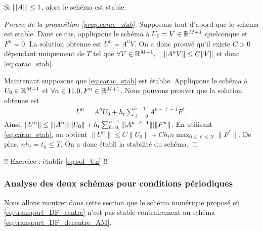 \documentclass[12pt,a4paper,twoside]{article}
\begin{document}
\begin{corrolary}
  \label{corro:stability}
  Si $\|\!\;\!| A \|\!\;\!| \leq 1$, alors le sch\'ema est stable.
\end{corrolary}

\begin{proof}[Preuve de la proposition \ref{prop:carac_stab}]
  Supposons tout d'abord que le sch\'ema est stable.
  Dans ce cas, appliquons le sch\'ema \`a $U_0 = V \in \mathbb{R}^{M+1}$
  quelconque et $F^n = 0$. 
  La solution obtenue est $U^n = A^n V$.
  On a donc prouv\'e qu'il existe $C>0$ d\'ependant uniquement
  de $T$ tel que
  $\forall V \in \mathbb{R}^{M+1} , \quad \| A^n V \| \leq C \| V \|$
  et donc \eqref{eq:carac_stab}.

  Maintenant supposons que \eqref{eq:carac_stab} est \'etablie.
  Appliquons le sch\'ema \`a $U_0 \in \mathbb{R}^{M+1}$
  et $\forall n \in 11.0 , F^n \in \mathbb{R}^{M+1}$.
  Nous pouvons prouver que la solution obtenue est
  \begin{align}
    \label{eq:sol_Un}
    U^n = A^n U_0 + h_t \sum_{\ell = 0}^{n-1} A^{n-\ell-1} F^{\ell} .
  \end{align}
  Ainsi, $\| U^n \| \leq \tn A^n \tn \| U_0 \| 
  + h_t \sum_{\ell = 0}^{n-1} \tn A^{n-\ell-1} \tn \| F^n \|$.
  En utilisant \eqref{eq:carac_stab}, on obtient
  $\| U^n \| \leq C \| U_0 \| + C h_t n \max_{0\leq \ell \leq N} \| F^{\ell} \|$.
  De plus, $n h_t = t_n \leq T$.
  On a donc \'etabli la stabilit\'e du sch\'ema.
\end{proof}


!! Exercice : \'etablir \eqref{eq:sol_Un} !!

\subsubsection{Analyse des deux sch\'emas pour conditions p\'eriodiques}


Nous allons montrer dans cette section que le sch\'ema num\'erique 
propos\'e en \eqref{eq:transport_DF_centre} n'est pas stable
contrairement au sch\'ema \eqref{eq:transport_DF_decentre_AM}.
\end{document}
